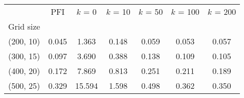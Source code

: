\begin{tabular}{ccccccc}
\toprule
{} &    PFI &  $k$ = 0 &  $k$ = 10 &  $k$ = 50 &  $k$ = 100 &  $k$ = 200 \\
Grid size &        &          &           &           &            &            \\
\midrule
(200, 10) &  0.045 &    1.363 &     0.148 &     0.059 &      0.053 &      0.057 \\
(300, 15) &  0.097 &    3.690 &     0.388 &     0.138 &      0.109 &      0.105 \\
(400, 20) &  0.172 &    7.869 &     0.813 &     0.251 &      0.211 &      0.189 \\
(500, 25) &  0.329 &   15.594 &     1.598 &     0.498 &      0.362 &      0.350 \\
\bottomrule
\end{tabular}
